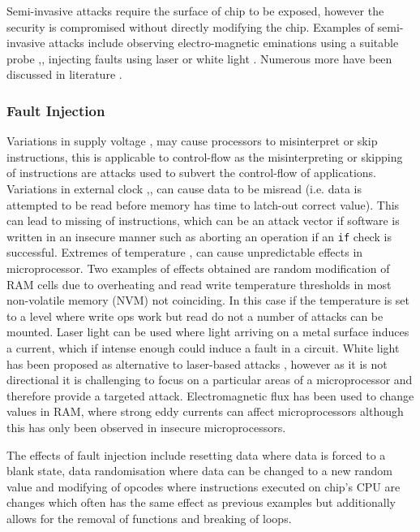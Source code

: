 Semi-invasive attacks  require the surface of chip to be exposed, however the security is compromised without directly modifying the chip. Examples of semi-invasive attacks include observing electro-magnetic eminations using a suitable probe \cite{Gandolfi2007},\cite{Quisquater2001}, injecting faults using laser \cite{Bar-el2006} or white light \cite{Skorobogatov2007}. Numerous more have been discussed in literature \cite{Skorobogatov2005}.

\subsubsection{Fault Injection}

Variations in supply voltage \cite{Anderson1996},\cite{Blomer2010} may cause processors to misinterpret or skip instructions, this is applicable to control-flow as the misinterpreting or skipping of instructions are attacks used to subvert the control-flow of applications.
Variations in external clock \cite{Anderson1996},\cite{Street},\cite{Kommerling1999} can cause data to be misread (i.e. data is attempted to be read before memory has time to latch-out correct value). This can lead to missing of instructions, which can be an attack vector if software is written in an insecure manner such as aborting an operation if an \verb|if| check is successful.
Extremes of temperature \cite{Boneh},\cite{Govindavajhala2003} can cause unpredictable effects in microprocessor. Two examples of effects obtained \cite{Bar-el2006} are random modification of RAM cells due to overheating and read write temperature thresholds in most non-volatile memory (NVM) not coinciding. In this case if the temperature is set to a level where write ops work but read do not a number of attacks can be mounted. Laser light \cite{Habing1965} can be used where light arriving on a metal surface induces a current, which if intense enough could induce a fault in a circuit. White light \cite{Anderson1996} has been proposed as alternative to laser-based attacks  \cite{Skorobogatov2007}, however as it is not directional it is challenging to focus on a particular areas of a microprocessor and therefore provide a targeted attack. Electromagnetic flux \cite{Samyde2003} has been used to change values in RAM, where strong eddy currents can affect microprocessors although this has only been observed in insecure microprocessors.

The effects of fault injection include resetting data where data is forced to a blank state, data randomisation where data can be changed to a new random value and modifying of opcodes where instructions executed on chip's CPU are changes\cite{Anderson1996} which often has the same effect as previous examples but additionally allows for the removal of functions and breaking of loops. 
\ifnotesincluded
{}
\fi
  
